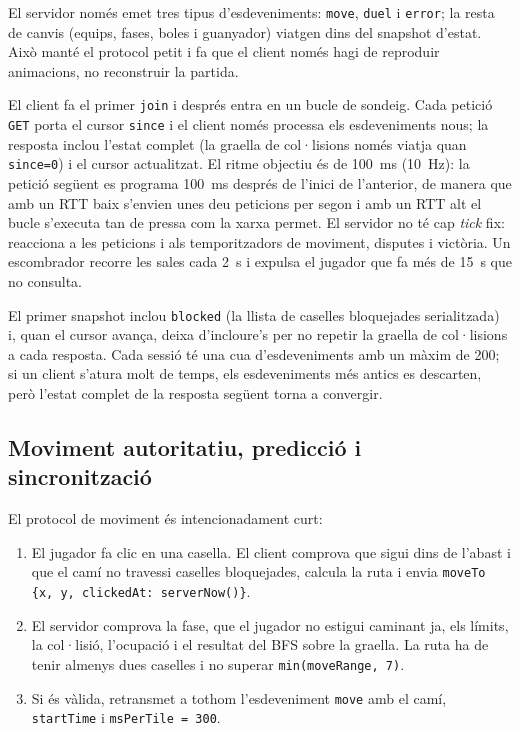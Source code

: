 \documentclass[11pt,a4paper]{article}
\begin{document}
El servidor només emet tres tipus d'esdeveniments: \texttt{move}, \texttt{duel} i
\texttt{error}; la resta de canvis (equips, fases, boles i guanyador) viatgen dins del
snapshot d'estat. Això manté el protocol petit i fa que el client només hagi de
reproduir animacions, no reconstruir la partida.

El client fa el primer \texttt{join} i després entra en un bucle de sondeig. Cada
petició \texttt{GET} porta el cursor \texttt{since} i el client només processa els
esdeveniments nous; la resposta inclou l'estat complet (la graella de col·lisions
només viatja quan \texttt{since=0}) i el cursor actualitzat. El ritme objectiu és de
100~ms (10~Hz): la petició següent es programa 100~ms després de l'inici de l'anterior,
de manera que amb un RTT baix s'envien unes deu peticions per segon i amb un RTT alt el
bucle s'executa tan de pressa com la xarxa permet. El servidor no té cap \emph{tick}
fix: reacciona a les peticions i als temporitzadors de moviment, disputes i victòria.
Un escombrador recorre les sales cada 2~s i expulsa el jugador que fa més de 15~s que no
consulta.

El primer snapshot inclou \texttt{blocked} (la llista de caselles bloquejades
serialitzada) i, quan el cursor avança, deixa d'incloure's per no repetir la graella de
col·lisions a cada resposta. Cada sessió té una cua
d'esdeveniments amb un màxim de 200; si un client s'atura molt de temps, els
esdeveniments més antics es descarten, però l'estat complet de la resposta següent
torna a convergir.

\subsection{Moviment autoritatiu, predicció i sincronització}

El protocol de moviment és intencionadament curt:

\begin{enumerate}[nosep]
  \item El jugador fa clic en una casella. El client comprova que sigui dins de
        l'abast i que el camí no travessi caselles bloquejades, calcula la ruta i
        envia \texttt{moveTo \{x, y, clickedAt: serverNow()\}}.
  \item El servidor comprova la fase, que el jugador no estigui caminant ja, els
        límits, la col·lisió, l'ocupació i el resultat del BFS sobre la graella. La
        ruta ha de tenir almenys dues caselles i no superar
        \texttt{min(moveRange, 7)}.
  \item Si és vàlida, retransmet a tothom l'esdeveniment \texttt{move} amb el camí,
        \texttt{startTime} i \texttt{msPerTile = 300}.
\end{enumerate}
\end{document}

